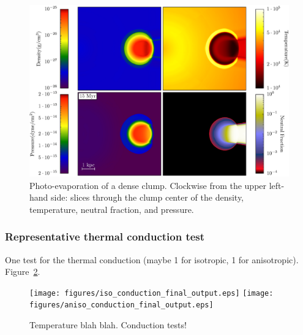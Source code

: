 \begin{figure}
  \centering
  \includegraphics[width=1.0\textwidth]{figures/code-test-shadowing.eps}
  \caption{Photo-evaporation of a dense clump.  Clockwise from the
    upper left-hand side: slices through the clump center of the
    density, temperature, neutral fraction, and pressure.}
  \label{fig:shadowing}
\end{figure}





\subsubsection{Representative thermal conduction test}
\label{sec.tests.conduct}
One test for the thermal conduction (maybe 1 for isotropic, 1 for
anisotropic).  Figure~\ref{fig.conduct}.

\begin{figure}
\begin{center}
\texttt{[image: figures/iso\_conduction\_final\_output.eps]}
\texttt{[image: figures/aniso\_conduction\_final\_output.eps]}
\caption{Temperature blah blah.  Conduction tests!}
\label{fig.conduct}
\end{center}
\end{figure}


